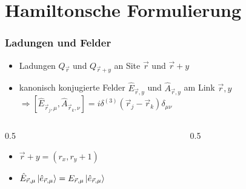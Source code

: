 \documentclass{beamer}
\begin{document}
\section{Hamiltonsche Formulierung}
\begin{frame}
	\frametitle{Ladungen und Felder}
	\begin{itemize}
		\item Ladungen $Q_{\vec{r}}$ und $Q_{\vec{r}+y}$ an Site $\vec{r}$ und $\vec{r} + y$
		\item kanonisch konjugierte Felder $\hat{E}_{\vec{r}, y}$ und $\hat{A}_{\vec{r}, y}$ am Link $\vec{r}, y$\\
		      $\Rightarrow[\hat{E}_{\vec{r}_j, \mu}, \hat{A}_{\vec{r}_k, \nu}] = i\delta^{(3)}(\vec{r}_j-\vec{r}_k)\delta_{\mu\nu}$
	\end{itemize}
	\begin{columns}
		\begin{column}{0.5\textwidth}
			\begin{itemize}
				\item $\vec{r} + y = (r_x, r_y + 1)$
				\item $\hat{E}_{\vec{r}, \mu}\ket{\hat{e}_{\vec{r}, \mu}}=E_{\vec{r}, \mu}\ket{\hat{e}_{\vec{r}, \mu}}$
			\end{itemize}
		\end{column}
		\begin{column}{0.5\textwidth}
			\begin{figure}[h]
				
			\end{figure}
		\end{column}
	\end{columns}
\end{frame}
\end{document}
